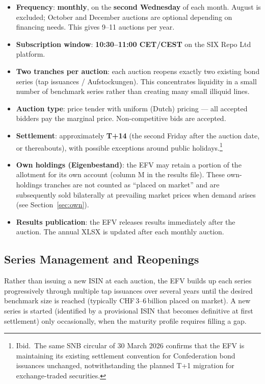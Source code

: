 \documentclass[12pt,a4paper]{article}
\begin{document}
\begin{itemize}[leftmargin=1.5em, itemsep=2pt]
  \item \textbf{Frequency}: \textbf{monthly}, on the \textbf{second Wednesday}
    of each month.  August is excluded; October and December auctions are
    optional depending on financing needs.  This gives 9--11 auctions per year.
  \item \textbf{Subscription window}: \textbf{10:30--11:00 CET/CEST} on the
    SIX Repo Ltd platform.
  \item \textbf{Two tranches per auction}: each auction reopens exactly two
    existing bond series (tap issuances / Aufstockungen).  This concentrates
    liquidity in a small number of benchmark series rather than creating many
    small illiquid lines.
  \item \textbf{Auction type}: price tender with uniform (Dutch) pricing ---
    all accepted bidders pay the marginal price.  Non-competitive bids are
    accepted.
  \item \textbf{Settlement}: approximately \textbf{T+14} (the second Friday
    after the auction date, or thereabouts), with possible exceptions around
    public holidays.\footnote{Ibid.\ The same SNB circular of 30 March 2026
    confirms that the EFV is maintaining its existing settlement convention for
    Confederation bond issuances unchanged, notwithstanding the planned T+1
    migration for exchange-traded securities.}
  \item \textbf{Own holdings (Eigenbestand)}: the EFV may retain a portion of
    the allotment for its own account (column M in the results file).  These
    own-holdings tranches are not counted as ``placed on market'' and are
    subsequently sold bilaterally at prevailing market prices when demand
    arises (see Section~\ref{sec:own}).
  \item \textbf{Results publication}: the EFV releases results immediately
    after the auction.  The annual XLSX is updated after each monthly auction.
\end{itemize}

\subsection{Series Management and Reopenings}

Rather than issuing a new ISIN at each auction, the EFV builds up each
series progressively through multiple tap issuances over several years until
the desired benchmark size is reached (typically CHF\,3--6\,billion placed
on market).  A new series is started (identified by a provisional ISIN that
becomes definitive at first settlement) only occasionally, when the maturity
profile requires filling a gap.
\end{document}
